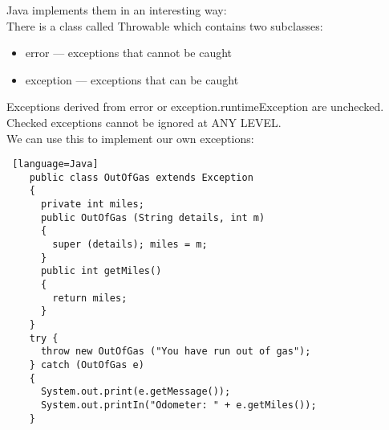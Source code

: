 \documentclass[../../lecture_notes.tex]{subfiles}
\begin{document}
\noindent Java implements them in an interesting way:\\
\indent There is a class called Throwable which contains two subclasses:
\begin{itemize} [itemsep=0mm]
	\item error — exceptions that cannot be caught
	\item exception — exceptions that can be caught
\end{itemize}
\noindent Exceptions derived from error or exception.runtimeException are unchecked.\\
Checked exceptions cannot be ignored at ANY LEVEL.\\
We can use this to implement our own exceptions:\\
\begin{lstlisting} [language=Java]
	public class OutOfGas extends Exception
	{
	  private int miles;
	  public OutOfGas (String details, int m) 
	  {
	    super (details); miles = m;
	  }
	  public int getMiles() 
	  {
	    return miles;
	  }
	}
	try {
	  throw new OutOfGas ("You have run out of gas");
	} catch (OutOfGas e) 
	{
	  System.out.print(e.getMessage());
	  System.out.printIn("Odometer: " + e.getMiles());
	}
\end{lstlisting} \medskip
\end{document}

